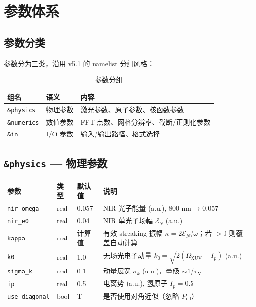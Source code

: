 \documentclass[11pt,a4paper]{ctexart}
\begin{document}
\section{参数体系}

\subsection{参数分类}

参数分为三类，沿用 v5.1 的 namelist 分组风格：

\begin{table}[H]
\centering
\caption{参数分组}
\begin{tabular}{p{2.5cm}p{3cm}p{7cm}}
\toprule
\textbf{组名} & \textbf{语义} & \textbf{内容} \\
\midrule
\texttt{\&physics} & 物理参数 & 激光参数、原子参数、核函数参数 \\
\texttt{\&numerics} & 数值参数 & FFT 点数、网格分辨率、截断/正则化参数 \\
\texttt{\&io} & I/O 参数 & 输入/输出路径、格式选择 \\
\bottomrule
\end{tabular}
\end{table}

\subsection{\texttt{\&physics} — 物理参数}

\begin{paramtable}
\begin{longtable}{p{2.8cm}p{1.5cm}p{2cm}p{5.5cm}}
\toprule
\textbf{参数} & \textbf{类型} & \textbf{默认值} & \textbf{说明} \\
\midrule
\texttt{nir\_omega}    & real & 0.057  & NIR 光子能量 (a.u.), 800 nm → 0.057 \\
\texttt{nir\_e0}       & real & 0.04   & NIR 单光子场幅 $\mathcal{E}_N$ (a.u.) \\
\texttt{kappa}         & real & 计算值  & 有效 streaking 振幅 $\kappa = 2\mathcal{E}_N/\omega$；若 $>0$ 则覆盖自动计算 \\
\texttt{k0}            & real & 1.0    & 无场光电子动量 $k_0 = \sqrt{2(\Omega_{\mathrm{XUV}} - I_p)}$ (a.u.) \\
\texttt{sigma\_k}      & real & 0.1    & 动量展宽 $\sigma_k$ (a.u.)，量级 $\sim 1/\tau_X$ \\
\texttt{ip}            & real & 0.5    & 电离势 (a.u.), 氢原子 $I_p = 0.5$ \\
\texttt{use\_diagonal} & bool & T & 是否使用对角近似（忽略 $P_{\text{off}}$） \\
\bottomrule
\end{longtable}
\end{paramtable}
\end{document}
